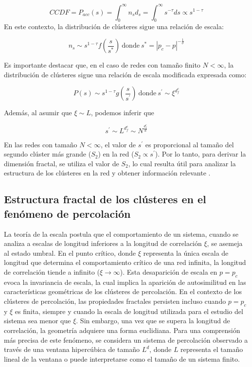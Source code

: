 \begin{equation}\label{eq:36}
CCDF=P_{acc}(s)=\int_{0}^{\infty}n_sd_s=\int_{0}^{\infty}{s^{-\tau}}ds\propto s^{1-\tau}
\end{equation}
En este contexto, la distribución de clústeres sigue una relación de escala:


\begin{equation}\label{eq:37}
n_s\sim s^{1-\tau}f\left(\frac{s}{s^{*}}\right) \ \text{donde} \ s^*=\left| p_c-p\right|^{-\frac{1}{\sigma}}
\end{equation}

Es importante destacar que, en el caso de redes con tamaño finito $N < \infty$, la distribución de clústeres sigue una relación de escala modificada expresada como:

\begin{equation}\label{eq:38}
P(s)\sim s^{1-\tau}g\left(\frac{s}{s^\prime}\right) \ \text{donde} \ s^{\prime} \sim \xi^{d^c_f}
\end{equation}

Además, al asumir que $\xi\sim L$, podemos inferir que

\begin{equation}\label{eq:39}
s^{\prime} \sim L^{d_f^c}\sim N^{\frac{d_f^c}{d}}
\end{equation}

En las redes con tamaño $N < \infty$, el valor de $s^{\prime}$ es proporcional al tamaño del segundo clúster más grande ($S_2$) en la red ($S_2 \propto  s^{\prime}$). Por lo tanto, para derivar la dimensión fractal, se utiliza el valor de $S_2$, lo cual resulta útil para analizar la estructura de los clústeres en la red y obtener información relevante \cite{tesis_Mahdi}.



\subsection{Estructura fractal de los clústeres en el fenómeno de percolación}

La teoría de la escala postula que el comportamiento de un sistema, cuando se analiza a escalas de longitud inferiores a la longitud de correlación $\xi$, se asemeja al estado umbral. En el punto crítico, donde $\xi$ representa la única escala de longitud que determina el comportamiento crítico de una red infinita, la longitud de correlación tiende a infinito ($\xi\to\infty$). Esta desaparición de escala en $p = p_c$ evoca la invariancia de escala, la cual implica la aparición de autosimilitud en las características geométricas de los clústeres de percolación. En el contexto de los clústeres de percolación, las propiedades fractales persisten incluso cuando $p = p_c$ y $\xi$ es finita, siempre y cuando la escala de longitud utilizada para el estudio del sistema sea menor que $\xi$. Sin embargo, una vez que se supera la longitud de correlación, la geometría adquiere una forma euclidiana. Para una comprensión más precisa de este fenómeno, se considera un sistema de percolación observado a través de una ventana hipercúbica de tamaño $L^d$, donde $L$ representa el tamaño lineal de la ventana o puede interpretarse como el tamaño de un sistema finito.

